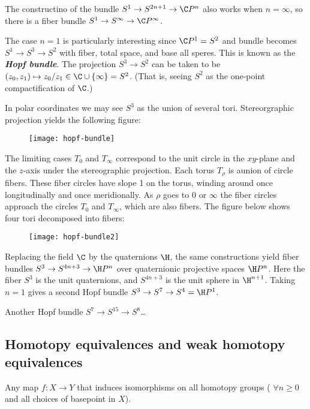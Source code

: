 \begin{remark}
\begin{example}
	The constructino of the bundle $S^1\to S^{2n+1}\to\C P^n$ also works when $n=\infty$, so there is a fiber bundle $S^1\to S^\infty\to \C P^\infty$.
	
	The case $n=1$ is particularly interesting since $\C P^1=S^2$ and bundle becomes $S^1\to S^3\to S^2$ with fiber, total space, and base all speres. This is known as the \textbf{\textit{Hopf bundle}}. The projection $S^3\to S^2$ can be taken to be $(z_0,z_1)\mapsto z_0/z_1\in\C\cup\{\infty\}=S^2$. {\color{persiangreen}(That is, seeing $S^2$ as the one-point compactification of $\C$.)}
	
	In polar coordinates we may see $S^3$ as the union of several tori. Stereorgraphic projection yields the following figure:
	\begin{figure}[H]
		\centering
		\texttt{[image: hopf-bundle]}
		\label{fig:hopf-bundle}
	\end{figure}
	The limiting cases $T_0$ and $T_\infty$ correspond to the unit circle in the $xy$-plane and the $z$-axis under the stereographic projection.	Each torus $T_\rho$ is aunion of circle fibers. These fiber circles have slope 1 on the torus, winding around once longitudinally and once meridionally. As $\rho$ goes to $0$ or $\infty$ the fiber circles approach the circles $T_0$ and $T_\infty$, which are also fibers. The figure below shows four tori decomposed into fibers:
	\begin{figure}[H]
		\centering
		\texttt{[image: hopf-bundle2]}
		\label{fig:hopf-bundle2}
	\end{figure}
	
	Replacing the field $\C$ by the quaternions $\H$, the same constructions yield fiber bundles $S^3\to S^{4n+3}\to\H P^{n}$ over quaternionic projective spaces $\H P^n$. Here the fiber $S^3$ is the unit quaternions, and $S^{4n+3}$ is the unit sphere in $\H^{n+1}$. Taking $n=1$ gives a second Hopf bundle $S^3\to S^7\to S^4=\H P^1$.
	
	Another Hopf bundle $S^7\to S^{15}\to S^8$…
\end{example}

\subsection{Homotopy equivalences and weak homotopy equivalences}

\begin{definition}
	Any map $f:X\to Y$ that induces isomorphisms on all homotopy groups ( $\forall n\geq 0$ and all choices of basepoint in $X$).
\end{definition}


\end{remark}

